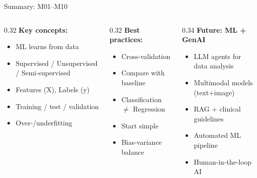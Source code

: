 \documentclass[aspectratio=169, 10pt]{beamer}
\begin{document}
\begin{frame}{Summary: M01--M10}
    \vspace{-2mm}
    \begin{columns}
        \begin{column}{0.32\textwidth}
            \textbf{\footnotesize Key concepts:}
            \scriptsize
            \begin{itemize}\setlength{\itemsep}{0pt}
                \item ML learns from data
                \item Supervised / Unsupervised / Semi-supervised
                \item Features (X), Labels (y)
                \item Training / test / validation
                \item Over-/underfitting
            \end{itemize}
        \end{column}
        \begin{column}{0.32\textwidth}
            \textbf{\footnotesize Best practices:}
            \scriptsize
            \begin{itemize}\setlength{\itemsep}{0pt}
                \item Cross-validation
                \item Compare with baseline
                \item Classification $\neq$ Regression
                \item Start simple
                \item Bias-variance balance
            \end{itemize}
        \end{column}
        \begin{column}{0.34\textwidth}
            \textbf{\footnotesize Future: ML + GenAI}
            \scriptsize
            \begin{itemize}\setlength{\itemsep}{0pt}
                \item LLM agents for data analysis
                \item Multimodal models (text+image)
                \item RAG + clinical guidelines
                \item Automated ML pipeline
                \item Human-in-the-loop AI
            \end{itemize}
        \end{column}
    \end{columns}


\end{frame}
\end{document}
